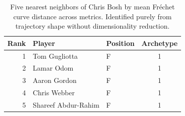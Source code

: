 \begin{table}[htbp]
  \centering\small
  \begin{tabular}{rllc}
    \toprule
    Rank & Player & Position & Archetype \\
    \midrule
    1 & Tom Gugliotta & F & 1 \\
    2 & Lamar Odom & F & 1 \\
    3 & Aaron Gordon & F & 1 \\
    4 & Chris Webber & F & 1 \\
    5 & Shareef Abdur-Rahim & F & 1 \\
    \bottomrule
  \end{tabular}
  \caption{Five nearest neighbors of Chris Bosh by mean Fr\'{e}chet curve distance across metrics. Identified purely from trajectory shape without dimensionality reduction.}
  \label{tab:Chris_Bosh_frechet_curve_neighbors}
\end{table}

